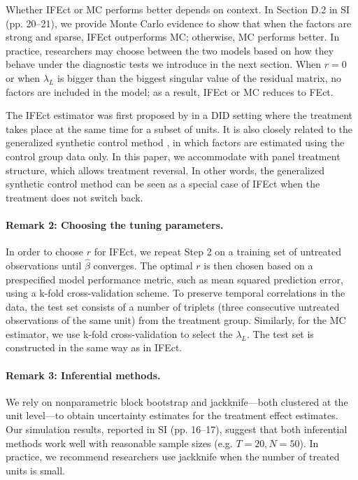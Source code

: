 \documentclass[12pt]{article}
\begin{document}
Whether IFEct or MC performs better depends on context. In Section D.2 in SI (pp. 20--21), we provide Monte Carlo evidence to show that when the factors are strong and sparse, IFEct outperforms MC; otherwise, MC performs better. In practice, researchers may choose between the two models based on how they behave under the diagnostic tests we introduce in the next section. When $r = 0$ or when $\lambda_{L}$ is bigger than the biggest singular value of the residual matrix, no factors are included in the model; as a result, IFEct or MC reduces to FEct. 

The IFEct estimator was first proposed by \citet{GobillonMagnac2016} in a DID setting where the treatment takes place at the same time for a subset of units. It is also closely related to the generalized synthetic control method  \citep{xu2017generalized}, in which factors are estimated using the control group data only. In this paper, we accommodate with panel treatment structure, which allows treatment reversal. In other words, the generalized synthetic control method can be seen as a special case of IFEct when the treatment does not switch back.

\paragraph{Remark 2: Choosing the tuning parameters.} In order to choose $r$ for IFEct, we repeat Step 2 on a training set of untreated observations until $\hat{\beta}$ converges. The optimal $r$ is then chosen based on a prespecified model performance metric, such as mean squared prediction error, using a k-fold cross-validation scheme. To preserve temporal correlations in the data, the test set consists of a number of triplets (three consecutive untreated observations of the same unit) from the treatment group. Similarly, for the MC estimator, we use k-fold cross-validation to select the $\lambda_{L}$. The test set is constructed in the same way as in IFEct. 

\paragraph{Remark 3: Inferential methods.} We rely on nonparametric block bootstrap and jackknife---both clustered at the unit level---to obtain uncertainty estimates for the treatment effect estimates. Our simulation results, reported in SI (pp. 16--17), suggest that both inferential methods work well with reasonable sample sizes (e.g. $T = 20, N = 50$). In practice, we recommend researchers use jackknife when the number of treated units is small. 
\end{document}
